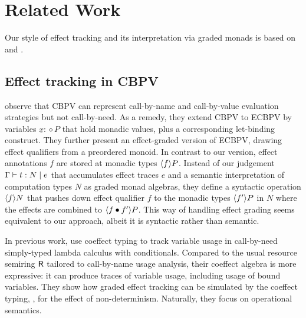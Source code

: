 \documentclass[acmsmall,review,anonymous]{acmart}\settopmatter{printfolios=true,printccs=false,printacmref=false}
\theoremstyle{remark}
\begin{document}
\section{Related Work}

Our style of effect tracking and its interpretation via graded monads
is based on \citet{wadlerThiemann:tocl03} and \citet{katsumata:popl14}.

\subsection{Effect tracking in CBPV}

\citet{mcDermottMycroft:esop19} observe that CBPV can represent
call-by-name and call-by-value evaluation strategies but not
call-by-need.  As a remedy, they extend CBPV to ECBPV by variables
$\underline x : \diamond P$ that hold monadic values, plus a
corresponding let-binding construct.  They further present an
effect-graded version of ECBPV, drawing effect qualifiers from a
preordered monoid.  In contrast to our version, effect annotations
$f$ are stored at monadic types $\compty f P$.  Instead of our
judgement $\CompTy \Gamma t e N$ that accumulates effect traces $e$
and a semantic interpretation of computation types $N$ as graded monad
algebras, they define a syntactic operation $\compty f N$ that pushes
down effect qualifier $f$ to the monadic types $\compty {f'} P$ in $N$
where the effects are combined to $\compty{f \bu f'} P$.  This way of
handling effect grading seems equivalent to our approach, albeit it is
syntactic rather than semantic.

In previous work, \citet{mcDermottMycroft:ocs18} use coeffect typing
to track variable usage in call-by-need simply-typed lambda calculus
with conditionals.  Compared to the usual resource semiring $\R$
tailored to call-by-name usage analysis, their coeffect algebra is
more expressive: it can produce traces of variable usage, including
usage of bound variables.  They show how graded effect tracking can be
simulated by the coeffect typing, \eg, for the effect of
non-determinism.  Naturally, they focus on operational semantics.

\end{document}
